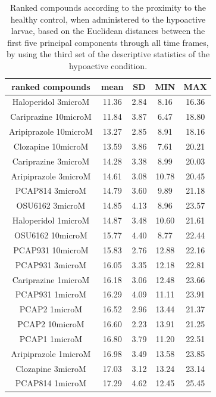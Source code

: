 \begin{table}[h!]\tiny
\centering
\caption{Ranked compounds according to the proximity to the healthy control, when administered to the hypoactive larvae, based on the Euclidean distances between the first five principal components through all time frames, by using the third set of the descriptive statistics of the hypoactive condition.}
\begin{tabular}{|c|c|c|c|c|}
\hline
ranked compounds             & mean & SD   & MIN  & MAX   \\ \hline
Haloperidol 3microM   & 11.36 & 2.84  & 8.16  & 16.36 \\ \hline
Cariprazine 10microM  & 11.84 & 3.87  & 6.47  & 18.80  \\ \hline
Aripiprazole 10microM & 13.27 & 2.85  & 8.91  & 18.16 \\ \hline
Clozapine 10microM    & 13.59 & 3.86  & 7.61  & 20.21 \\ \hline
Cariprazine 3microM   & 14.28 & 3.38  & 8.99  & 20.03 \\ \hline
Aripiprazole 3microM  & 14.61 & 3.08  & 10.78 & 20.45 \\ \hline
PCAP814 3microM       & 14.79 & 3.60   & 9.89  & 21.18 \\ \hline
OSU6162 3microM       & 14.85 & 4.13  & 8.96  & 23.57 \\ \hline
Haloperidol 1microM   & 14.87 & 3.48  & 10.60  & 21.61 \\ \hline
OSU6162 10microM      & 15.77 & 4.40   & 8.77  & 22.44 \\ \hline
PCAP931 10microM      & 15.83 & 2.76  & 12.88 & 22.16 \\ \hline
PCAP931 3microM       & 16.05 & 3.35  & 12.18 & 22.81 \\ \hline
Cariprazine 1microM   & 16.18 & 3.06  & 12.48 & 23.66 \\ \hline
PCAP931 1microM       & 16.29 & 4.09  & 11.11 & 23.91 \\ \hline
PCAP2 1microM         & 16.52 & 2.96  & 13.44 & 21.37 \\ \hline
PCAP2 10microM        & 16.60  & 2.23  & 13.91 & 21.25 \\ \hline
PCAP1 1microM         & 16.80  & 3.79  & 11.20  & 22.51 \\ \hline
Aripiprazole 1microM  & 16.98 & 3.49  & 13.58 & 23.85 \\ \hline
Clozapine 3microM     & 17.03 & 3.12  & 13.24 & 23.14 \\ \hline
PCAP814 1microM       & 17.29 & 4.62  & 12.45 & 25.45 \\ \hline

\end{tabular}
\end{table}
